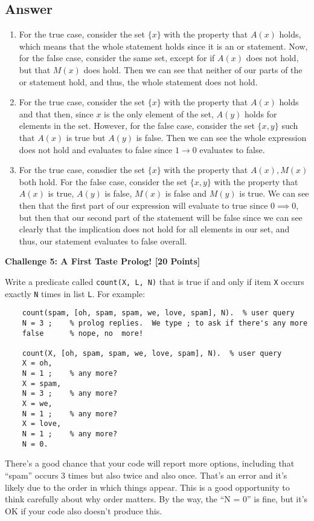 \documentclass[12pt]{article}
\newcommand{\IMPLIES}{\rightarrow}
\newcommand{\Problem}[3]{\mbox{} \newline \noindent \textbf{\textbf{Challenge #1: #2 [#3 Points] \\ }}}
\begin{document}
\subsection*{Answer}
\begin{enumerate}
	\item For the true case, consider the set $\{x\}$ with the property that $A(x)$ holds, which means that the whole statement holds since it is an or statement. Now, for the false case, consider the same set, except for if $A(x)$ does not hold, but that $M(x)$ does hold. Then we can see that neither of our parts of the or statement hold, and thus, the whole statement does not hold.
	\item For the true case, consider the set $\{x\}$ with the property that $A(x)$ holds and that then, since $x$ is the only element of the set, $A(y)$ holds for elements in the set. However, for the false case, consider the set $\{x,y\}$ such that $A(x)$ is true but $A(y)$ is false. Then we can see the whole expression does not hold and evaluates to false since $1 \IMPLIES 0$ evaluates to false.
	\item For the true case, consdier the set $\{x\}$ with the property that $A(x), M(x)$ both hold. For the false case, consider the set $\{x,y\}$ with the property that $A(x)$ is true, $A(y)$ is false, $M(x)$ is false and $M(y)$ is true. We can see then that the first part of our expression will evaluate to true since $0 \implies 0$, but then that our second part of the statement will be false since we can see clearly that the implication does not hold for all elements in our set, and thus, our statement evaluates to false overall.
\end{enumerate}

\Problem{5}{A First Taste Prolog!}{20}

Write a predicate called \verb+count(X, L, N)+ that is true if and only if item \verb+X+ occurs exactly \verb+N+ times in list \verb+L+.  For example:
	\begin{verbatim}
	count(spam, [oh, spam, spam, we, love, spam], N).  % user query
	N = 3 ;    % prolog replies.  We type ; to ask if there's any more
	false      % nope, no  more!
	
	count(X, [oh, spam, spam, we, love, spam], N).  % user query
	X = oh,
	N = 1 ;    % any more?
	X = spam,
	N = 3 ;    % any more?
	X = we,
	N = 1 ;    % any more?
	X = love,
	N = 1 ;    % any more?
	N = 0.
\end{verbatim}
	 
	 There's a good chance that your code will report more options, including that ``spam'' occurs 3 times but also twice and also once.  That's an error and it's likely due to the order in which things appear.  This is a good opportunity to think carefully about why order matters.  By the way, the ``N = 0'' is fine, but it's OK if your code also doesn't produce this.
\end{document}
